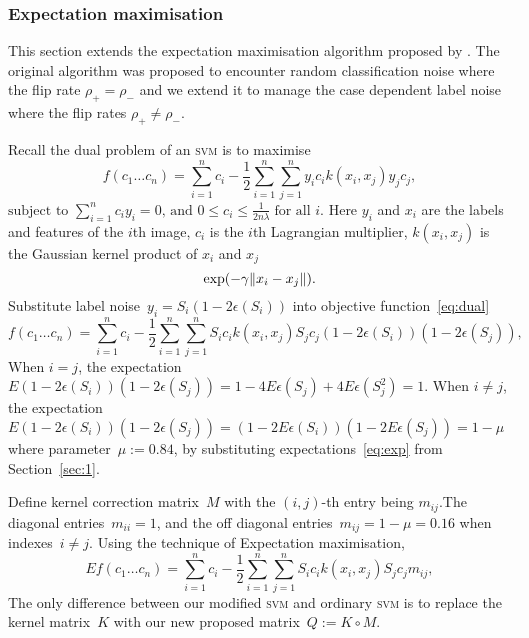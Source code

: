 \documentclass{article} %
\DeclarePairedDelimiter{\norm}{\lVert}{\rVert}
\begin{document}
\subsubsection{Expectation maximisation}
This section extends the expectation maximisation algorithm proposed by \citet{pmlr-v20-biggio11}. The original algorithm was proposed to encounter random classification noise where the flip rate $\rho_+=\rho_-$ and we extend it to manage the case dependent label noise where the flip rates $\rho_+\neq\rho_-$.

Recall the dual problem of an \textsc{svm} is to maximise
\begin{equation}
   f(c_{1}\ldots c_{n})=\sum _{i=1}^{n}c_{i}-{\frac {1}{2}}\sum _{i=1}^{n}\sum _{j=1}^{n}y_{i}c_{i}k(x_{i},x_{j})y_{j}c_{j}, \label{eq:dual}
\end{equation}
\begin{math}
{\text{subject to }}\sum _{i=1}^{n}c_{i}y_{i}=0,\,{\text{and }}0\leq c_{i}\leq {\frac {1}{2n\lambda }}\;{\text{for all }}i.
\end{math}
Here $y_i$ and $x_i$ are the labels and features of the $i$th image, $c_i$ is the $i$th Lagrangian multiplier, $k(x_i,x_j)$ is the Gaussian kernel product of $x_i$ and $x_j$
\begin{equation*}
\exp(-\gamma\norm{x_i-x_j}).
\end{equation*}
Substitute label noise~$y_i=S_i(1-2\epsilon(S_i))$ into objective function~\eqref{eq:dual}
\begin{equation}
   f(c_{1}\ldots c_{n})=\sum _{i=1}^{n}c_{i}-{\frac {1}{2}}\sum _{i=1}^{n}\sum _{j=1}^{n}S_{i}c_{i}k(x_{i},x_{j})S_{j}c_{j}(1-2\epsilon(S_i))(1-2\epsilon(S_j)), \label{eq:dual2}
\end{equation}
When $i=j$, the expectation~$E(1-2\epsilon(S_i))(1-2\epsilon(S_j))=1-4E\epsilon(S_j)+4E\epsilon(S_j^2)=1$. When $i\neq j$, the expectation~$E(1-2\epsilon(S_i))(1-2\epsilon(S_j))=(1-2E\epsilon(S_i))(1-2E\epsilon(S_j))=1-\mu$ where parameter~$\mu:=0.84$, by substituting expectations~\eqref{eq:exp} from Section~\ref{sec:1}.

Define kernel correction matrix~$M$ with the $(i,j)$-th entry being $m_{ij}$.The diagonal entries~$m_{ii}=1 $, and the off diagonal entries~$m_{ij}=1-\mu=0.16$ when indexes~$i\neq j$. Using the technique of Expectation maximisation,
\begin{equation}
   Ef(c_{1}\ldots c_{n})=\sum _{i=1}^{n}c_{i}-{\frac {1}{2}}\sum _{i=1}^{n}\sum _{j=1}^{n}S_{i}c_{i}k(x_{i},x_{j})S_{j}c_{j}m_{ij}, \label{eq:dual3}
\end{equation}
The only difference between our modified \textsc{svm} and ordinary \textsc{svm} is to replace the kernel matrix~$K$ with our new proposed matrix~$Q:=K\circ M$.
\end{document}

